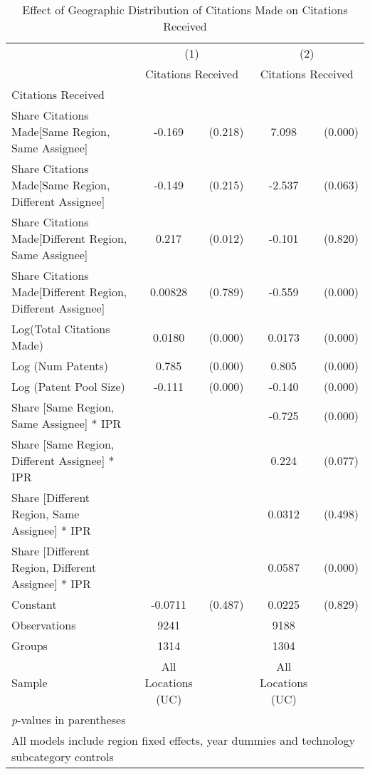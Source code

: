 {
\begin{longtable}{l*{2}{cc}}
\caption{Effect of Geographic Distribution of Citations Made on Citations Received \label{model14}}\\
\hline\hline\endfirsthead\hline\endhead\hline\endfoot\endlastfoot
                &\multicolumn{2}{c}{(1)}&\multicolumn{2}{c}{(2)}\\
                &\multicolumn{2}{c}{Citations Received}&\multicolumn{2}{c}{Citations Received}\\
\hline
Citations Received&         &         &         &         \\
Share Citations Made[Same Region, Same Assignee]&   -0.169&  (0.218)&    7.098&  (0.000)\\
Share Citations Made[Same Region, Different Assignee]&   -0.149&  (0.215)&   -2.537&  (0.063)\\
Share Citations Made[Different Region, Same Assignee]&    0.217&  (0.012)&   -0.101&  (0.820)\\
Share Citations Made[Different Region, Different Assignee]&  0.00828&  (0.789)&   -0.559&  (0.000)\\
Log(Total Citations Made)&   0.0180&  (0.000)&   0.0173&  (0.000)\\
Log (Num Patents)&    0.785&  (0.000)&    0.805&  (0.000)\\
Log (Patent Pool Size)&   -0.111&  (0.000)&   -0.140&  (0.000)\\
Share [Same Region, Same Assignee] * IPR&         &         &   -0.725&  (0.000)\\
Share [Same Region, Different Assignee] * IPR&         &         &    0.224&  (0.077)\\
Share [Different Region, Same Assignee] * IPR&         &         &   0.0312&  (0.498)\\
Share [Different Region, Different Assignee] * IPR&         &         &   0.0587&  (0.000)\\
Constant        &  -0.0711&  (0.487)&   0.0225&  (0.829)\\
\hline
Observations    &     9241&         &     9188&         \\
Groups          &     1314&         &     1304&         \\
Sample          &All Locations (UC)&         &All Locations (UC)&         \\
\hline\hline
\multicolumn{5}{l}{\footnotesize \textit{p}-values in parentheses}\\
\multicolumn{5}{l}{\footnotesize All models include region fixed effects, year dummies and technology subcategory controls}\\
\end{longtable}
}
